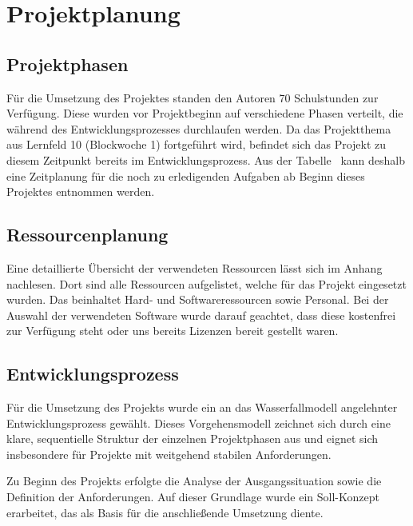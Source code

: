 \section{Projektplanung} 
\label{sec:Projektplanung}

\subsection{Projektphasen}
\label{sec:Projektphasen}
Für die Umsetzung des Projektes standen den Autoren 70 Schulstunden zur Verfügung. Diese wurden vor Projektbeginn auf
verschiedene Phasen verteilt, die während des Entwicklungsprozesses durchlaufen werden. Da das Projektthema aus Lernfeld
10 (Blockwoche 1) fortgeführt wird, befindet sich das Projekt zu diesem Zeitpunkt bereits im Entwicklungsprozess. Aus der
Tabelle~ kann deshalb eine Zeitplanung für die noch zu erledigenden Aufgaben ab Beginn dieses
Projektes entnommen werden.
 \\

\subsection{Ressourcenplanung}
\label{sec:Ressourcenplanung}
Eine detaillierte Übersicht der verwendeten Ressourcen lässt sich im Anhang
 nachlesen. Dort sind alle Ressourcen aufgelistet, welche für das 
Projekt eingesetzt wurden. Das beinhaltet Hard- und Softwareressourcen sowie Personal. Bei der
Auswahl der verwendeten Software wurde darauf geachtet, dass diese kostenfrei zur Verfügung steht
oder uns bereits Lizenzen bereit gestellt waren. 

\subsection{Entwicklungsprozess}
\label{sec:Entwicklungsprozess}
Für die Umsetzung des Projekts wurde ein an das Wasserfallmodell angelehnter Entwicklungsprozess gewählt. Dieses Vorgehensmodell zeichnet
sich durch eine klare, sequentielle Struktur der einzelnen Projektphasen aus und eignet sich insbesondere für Projekte mit weitgehend stabilen
Anforderungen.

Zu Beginn des Projekts erfolgte die Analyse der Ausgangssituation sowie die Definition der Anforderungen. Auf dieser Grundlage wurde ein
Soll-Konzept erarbeitet, das als Basis für die anschließende Umsetzung diente.

